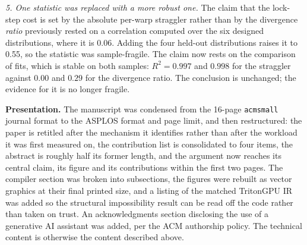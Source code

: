 \documentclass[10pt]{article}
\begin{document}
\emph{5. One statistic was replaced with a more robust one.} The claim that the
lock-step cost is set by the absolute per-warp straggler rather than by the
divergence \emph{ratio} previously rested on a correlation computed over the six
designed distributions, where it is 0.06. Adding the four held-out distributions
raises it to 0.55, so the statistic was sample-fragile. The claim now rests on the
comparison of fits, which is stable on both samples: $R^2 = 0.997$ and $0.998$ for
the straggler against $0.00$ and $0.29$ for the divergence ratio. The conclusion is
unchanged; the evidence for it is no longer fragile.

\textbf{Presentation.} The manuscript was condensed from the 16-page
\texttt{acmsmall} journal format to the ASPLOS format and page limit, and then
restructured: the paper is retitled after the mechanism it identifies rather than
after the workload it was first measured on, the contribution list is consolidated
to four items, the abstract is roughly half its former length, and the argument now
reaches its central claim, its figure and its contributions within the first two
pages. The compiler section was broken into subsections, the figures were rebuilt as
vector graphics at their final printed size, and a listing of the matched TritonGPU
IR was added so the structural impossibility result can be read off the code rather
than taken on trust. An acknowledgments section disclosing the use of a generative AI
assistant was added, per the ACM authorship policy. The technical content is
otherwise the content described above.
\end{document}
